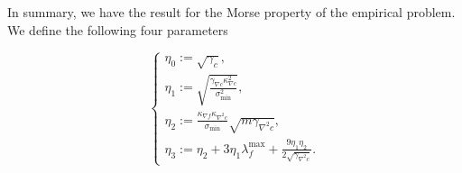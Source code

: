 %

In summary, we have the result for the Morse property of the empirical problem. We define the following four parameters

\[
\begin{cases}
	\eta_0:=\sqrt{ \gamma_c} ,\\
	\eta_1:=\sqrt{\frac{\gamma_{\nabla c} \kappa_{\nabla c}^2}{\sigma_{\min}^2} },\\
	\eta_2:=\tfrac{\kappa_{\nabla f}\kappa_{\nabla^2 c}}{\sigma_{\min}}\sqrt{m\gamma_{\nabla^2 c}},\\
	\eta_3:=\eta_2 +3\eta_1 \lambda_f^{\max}+\frac{9\eta_1\eta_2}{2\sqrt{\gamma_{\nabla^2 c}}}.
\end{cases}
\]

